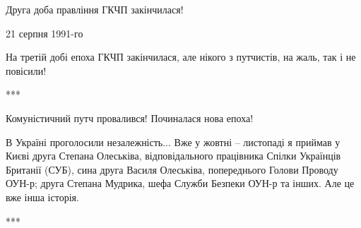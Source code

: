 Друга доба правління ГКЧП закінчилася!

21 серпня 1991-го

На третій добі епоха ГКЧП закінчилася, але нікого з путчистів, на жаль, так і
не повісили!

***

Комуністичний путч провалився! Починалася нова епоха!

В Україні проголосили незалежність... Вже у жовтні – листопаді я приймав у Києві
друга Степана Олеськіва, відповідального працівника Спілки Українців Британії
(СУБ), сина друга Василя Олеськіва, попереднього Голови Проводу ОУН-р; друга
Степана Мудрика, шефа Служби Безпеки ОУН-р та інших. Але це вже інша історія.

***

